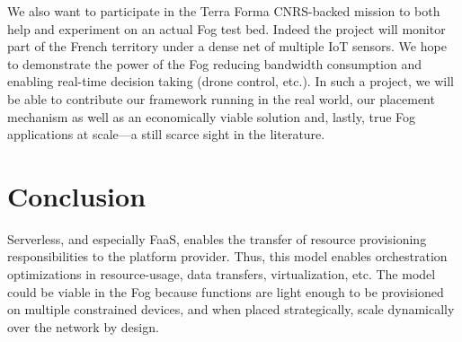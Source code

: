 We also want to participate in the Terra Forma \cite{longuevergne_terra_2022} CNRS-backed mission to both help and experiment on an actual Fog test bed. Indeed the project will monitor part of the French territory under a dense net of multiple \gls{IoT} sensors. We hope to demonstrate the power of the Fog reducing bandwidth consumption and enabling real-time decision taking (drone control, etc.). In such a project, we will be able to contribute our framework running in the real world, our placement mechanism as well as an economically viable solution and, lastly, true Fog applications at scale—a still scarce sight in the literature.

\section{Conclusion}


Serverless, and especially \gls{FaaS}, enables the transfer of resource provisioning responsibilities to the platform provider. Thus, this model enables orchestration optimizations in resource-usage, data transfers, virtualization, etc. The model could be viable in the Fog because functions are light enough to be provisioned on multiple constrained devices, and when placed strategically, scale dynamically over the network by design.

